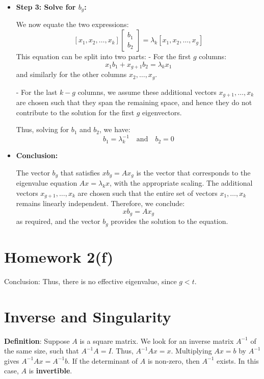 \documentclass{article}
\begin{document}
\begin{itemize}
    \item \textbf{Step 3: Solve for \( b_g \):}

    We now equate the two expressions:
    \[
    [x_1, x_2, \dots, x_k] \begin{bmatrix} b_1 \\ b_2 \end{bmatrix} = \lambda_k [x_1, x_2, \dots, x_g]
    \]
    This equation can be split into two parts:
    - For the first \( g \) columns:
    \[
    x_1 b_1 + x_{g+1} b_2 = \lambda_k x_1
    \]
    and similarly for the other columns \( x_2, \dots, x_g \).

    - For the last \( k - g \) columns, we assume these additional vectors \( x_{g+1}, \dots, x_k \) are chosen such that they span the remaining space, and hence they do not contribute to the solution for the first \( g \) eigenvectors.

    Thus, solving for \( b_1 \) and \( b_2 \), we have:
    \[
    b_1 = \lambda_k^{-1} \quad \text{and} \quad b_2 = 0
    \]

    \item \textbf{Conclusion:}

    The vector \( b_g \) that satisfies \( x b_g = A x_g \) is the vector that corresponds to the eigenvalue equation \( A x = \lambda_k x \), with the appropriate scaling. The additional vectors \( x_{g+1}, \dots, x_k \) are chosen such that the entire set of vectors \( x_1, \dots, x_k \) remains linearly independent. Therefore, we conclude:
    \[
    x b_g = A x_g
    \]
    as required, and the vector \( b_g \) provides the solution to the equation.

\end{itemize}

\section{Homework 2(f)}
Conclusion: Thus, there is no effective eigenvalue, since $g < t$.

\date{\today}
\section{Inverse and Singularity}
\textbf{Definition}:  
Suppose \( A \) is a square matrix. We look for an inverse matrix \( A^{-1} \) of the same size, such that \( A^{-1}A = I \). Thus, \( A^{-1}Ax = x \). Multiplying \( Ax = b \) by \( A^{-1} \) gives \( A^{-1}Ax = A^{-1}b \). If the determinant of \( A \) is non-zero, then \( A^{-1} \) exists. In this case, \( A \) is \textbf{invertible}.
\end{document}
